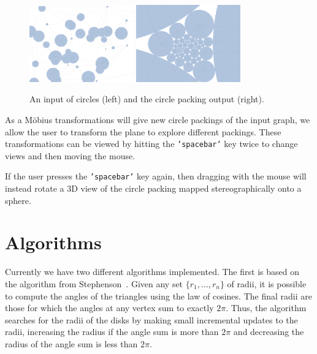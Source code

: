 \documentclass[a4paper,UKenglish]{lipics-v2016}
\begin{document}
  \begin{figure}[ht]
    \centering
      \includegraphics[width = 0.40\textwidth]{figures/input.png}
      \includegraphics[width = 0.40\textwidth]{figures/output.png}
    \caption{An input of circles (left) and the circle packing output (right).}
    \label{fig:input_output}
  \end{figure}
  
  As a M\"{o}bius transformations will give new circle packings of the input graph, we allow the user to transform the plane to explore different packings.
  These transformations can be viewed by hitting the \texttt{'spacebar'} key twice to change views and then moving the mouse.
  
  If the user presses the \texttt{'spacebar'} key again, then dragging with the mouse will instead rotate a 3D view of the circle packing mapped stereographically onto a sphere.
  
\section{Algorithms}
\label{sec:algorithms}

  Currently we have two different algorithms implemented.
  The first is based on the algorithm from Stephenson~\cite{stephenson05introduction}.
  Given any set $\{r_1,\ldots, r_n\}$ of radii, it is possible to compute the angles of the triangles using the law of cosines.
  The final radii are those for which the angles at any vertex sum to exactly $2\pi$.
  Thus, the algorithm searches for the radii of the disks by making small incremental updates to the radii, increasing the radius if the angle sum is more than $2\pi$ and decreasing the radius of the angle sum is less than $2\pi$.
  
\end{document}
